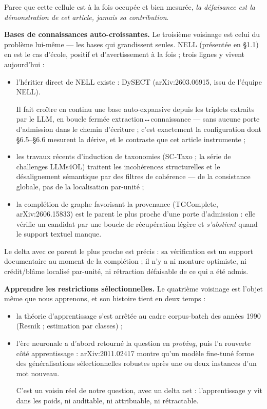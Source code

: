 \documentclass[11pt]{article}
\begin{document}
Parce que cette cellule est à la fois occupée et bien mesurée, \emph{la défaisance est la démonstration de cet article, jamais sa contribution}.

\textbf{Bases de connaissances auto-croissantes.} Le troisième voisinage est celui du problème lui-même — les bases qui grandissent seules. NELL (présentée en §1.1) en est le cas d'école, positif et d'avertissement à la fois ; trois lignes y vivent aujourd'hui :

\begin{itemize}
\item l'héritier direct de NELL existe : DySECT (arXiv:2603.06915, issu de l'équipe NELL). \par Il fait croître en continu une base auto-expansive depuis les triplets extraits par le LLM, en boucle fermée extraction↔connaissance — sans aucune porte d'admission dans le chemin d'écriture ; c'est exactement la configuration dont §6.5–§6.6 mesurent la dérive, et le contraste que cet article instrumente ;

\item les travaux récents d'induction de taxonomies (SC-Taxo ; la série de challenges LLMs4OL) traitent les incohérences structurelles et le désalignement sémantique par des filtres de cohérence — de la consistance globale, pas de la localisation par-unité ;
\item la complétion de graphe favorisant la provenance (TGComplete, arXiv:2606.15833) est le parent le plus proche d'une porte d'admission : elle vérifie un candidat par une boucle de récupération légère et \emph{s'abstient} quand le support textuel manque.
\end{itemize}

Le delta avec ce parent le plus proche est précis : sa vérification est un support documentaire au moment de la complétion ; il n'y a ni monture optimiste, ni crédit/blâme localisé par-unité, ni rétraction défaisable de ce qui a été admis.

\textbf{Apprendre les restrictions sélectionnelles.} Le quatrième voisinage est l'objet même que nous apprenons, et son histoire tient en deux temps :

\begin{itemize}
\item la théorie d'apprentissage s'est arrêtée au cadre corpus-batch des années 1990 (Resnik ; estimation par classes) ;
\item l'ère neuronale a d'abord retourné la question en \emph{probing}, puis l'a rouverte côté apprentissage : arXiv:2011.02417 montre qu'un modèle fine-tuné forme des généralisations sélectionnelles robustes après une ou deux instances d'un mot nouveau. \par C'est un voisin réel de notre question, avec un delta net : l'apprentissage y vit dans les poids, ni auditable, ni attribuable, ni rétractable.
\end{itemize}
\end{document}
